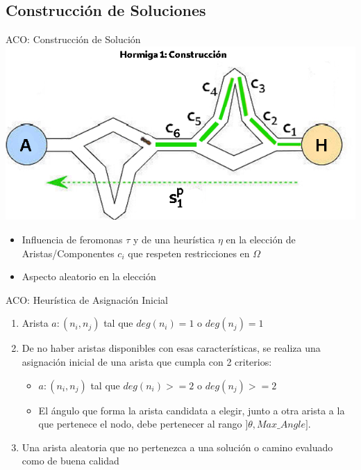 \subsection{Construcci\'on de Soluciones}
\begin{frame}{ACO: Construcci\'on de Soluci\'on}
\centering
\includegraphics[scale=0.35]{Pictures/ACO-ant-Constr.png}
\begin{itemize}
    \item Influencia de feromonas $\tau$ y de una heur\'istica $\eta$ en la elecci\'on de Aristas/Componentes $c_i$ que respeten restricciones en $\Omega$
    \item Aspecto aleatorio en la elecci\'on
\end{itemize}
\end{frame}

\begin{frame}{ACO: Heur\'istica de Asignaci\'on Inicial}
\begin{enumerate}
\item Arista $a: (n_i,n_j)$ tal que $deg(n_i) = 1$ o $deg(n_j) = 1$ 

\item De no haber aristas disponibles con esas caracter\'isticas, se realiza una asignaci\'on inicial de una arista que cumpla con 2 criterios:
\begin{itemize}
    \item $a: (n_i,n_j)$ tal que $deg(n_i) >= 2$ o $deg(n_j) >= 2$ 
    \item El \'angulo que forma la arista candidata a elegir, junto a otra arista a la que pertenece el nodo, debe pertenecer al rango $]\theta, Max\_Angle]$.
\end{itemize}

\item Una arista aleatoria que no pertenezca a una soluci\'on o camino evaluado como de buena calidad
\end{enumerate}
\end{frame}

